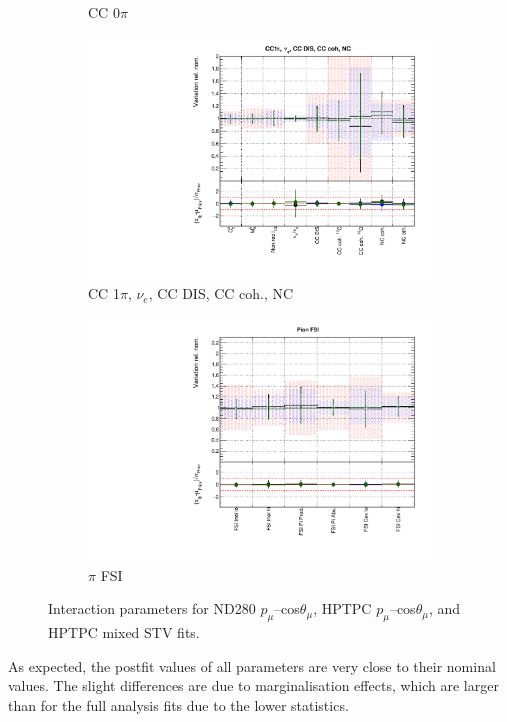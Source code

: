 \begin{figure}[!htbp]
\begin{subfigure}{0.49\textwidth}
  \caption{CC 0$\pi$}
\end{subfigure}
\begin{subfigure}{0.49\textwidth}
  \centering
  \includegraphics[width=0.95\linewidth]{figs/hptpcfitsxsec_2}
  \caption{CC 1$\pi$, $\nu_e$, CC DIS, CC coh., NC}
\end{subfigure}
\begin{subfigure}{0.49\textwidth}
  \centering
  \includegraphics[width=0.95\linewidth]{figs/hptpcfitsxsec_3}
  \caption{$\pi$ FSI}
\end{subfigure}
\caption{Interaction parameters for ND280 $p_{\mu}$--cos$\theta_{\mu}$, HPTPC $p_{\mu}$--cos$\theta_{\mu}$, and HPTPC mixed STV fits.}
\label{fig:hptpcxsec}
\end{figure}

As expected, the postfit values of all parameters are very close to their nominal values. The slight differences are due to marginalisation effects, which are larger than for the full analysis fits due to the lower statistics.

